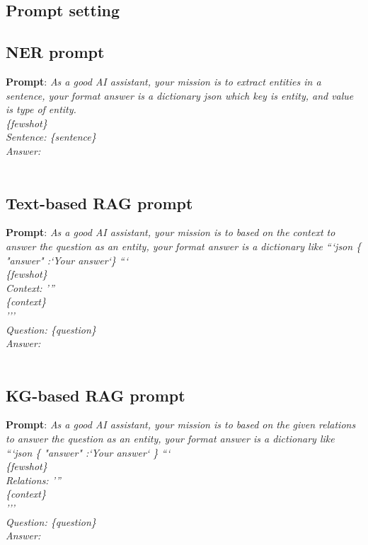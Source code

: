 \addto{}
\appendixtitleon
\appendixtitletocon
\begin{appendices}
\chapter{Prompt setting}
\label{apd:A}

\section{NER prompt}
\textbf{Prompt}: \textit{As a good AI assistant, your mission is to extract entities in a sentence, your format answer is a dictionary json which key is entity, and value is type of entity.\\
\{fewshot\}\\
Sentence: \{sentence\}\\
Answer: }\\\\

\section{Text-based RAG prompt}
\textbf{Prompt}: \textit{As a good AI assistant, your mission is to based on the context to answer the question as an entity, your format answer is a dictionary like ```json \{ "answer" :`Your answer`\} ```\\
\{fewshot\}\\
Context: '''\\
\{context\}\\
'''\\
Question: \{question\}\\
Answer: }\\\\

\section{KG-based RAG prompt}
\textbf{Prompt}: \textit{As a good AI assistant, your mission is to based on the given relations to answer the question as an entity, your format answer is a dictionary like ```json \{ "answer" :`Your answer` \} ```\\
\{fewshot\}\\
Relations: '''\\
\{context\}\\
'''\\
Question: \{question\}\\
Answer: }\\\\


\end{appendices}
